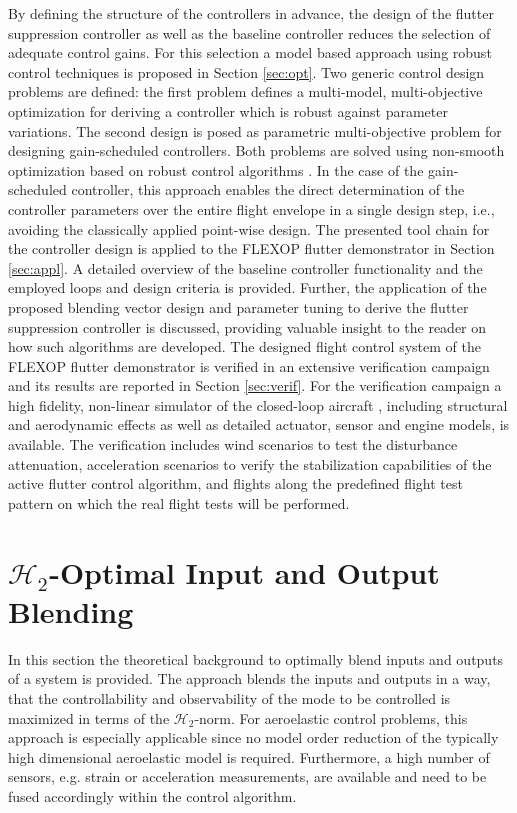 \documentclass[aerospace,article,submit,moreauthors,pdftex,10pt,a4paper]{Definitions/mdpi}
\begin{document}
By defining the structure of the controllers in advance, the design of the flutter suppression controller as well as the baseline controller reduces the selection of adequate control gains. For this selection a model based approach using robust control techniques is proposed in Section \ref{sec:opt}. Two generic control design problems are defined:  the first problem defines a multi-model, multi-objective optimization for deriving a controller which is robust against parameter variations. The second design is posed as parametric multi-objective problem for designing gain-scheduled controllers. Both problems are solved using non-smooth optimization based on robust control algorithms \cite{Apkarian06}.  In the case of the gain-scheduled controller, this approach enables the direct determination of the controller parameters over the entire flight envelope in a single design step, i.e., avoiding the classically applied point-wise design. 
The presented tool chain for the controller design is applied to the FLEXOP flutter demonstrator in Section \ref{sec:appl}.
A detailed overview of the baseline controller functionality and the employed loops and design criteria is provided. Further, the application of the proposed blending vector design and parameter tuning to derive the flutter suppression controller is discussed, providing valuable insight to the reader on how such algorithms are developed.
The designed flight control system of the FLEXOP flutter demonstrator is verified in an extensive verification campaign and its results are reported in Section \ref{sec:verif}. For the verification campaign a high fidelity, non-linear simulator of the closed-loop aircraft \cite{Wuestenhagen18,Meddaikar19}, including structural and aerodynamic  effects as well as detailed actuator, sensor and engine models, is available.
The verification includes wind scenarios to test the disturbance attenuation, acceleration scenarios to verify the stabilization capabilities of the active flutter control algorithm, and  flights along the predefined flight test pattern on which the real flight tests will be performed.

\section{$\mathcal{H}_{2}$-Optimal Input and Output Blending}\label{sec:blend}
In this section the theoretical background to optimally blend  inputs and outputs of a system is provided. The approach blends the inputs and outputs in a way, that the controllability and observability of the mode to be controlled is maximized in terms of the $\mathcal{H}_{2}$-norm. 
For aeroelastic control problems, this approach is especially applicable since no model order reduction of the typically high dimensional aeroelastic model is required. Furthermore, a high number of sensors, e.g. strain or acceleration measurements, are available and need to be fused accordingly within the control algorithm. 
\end{document}
